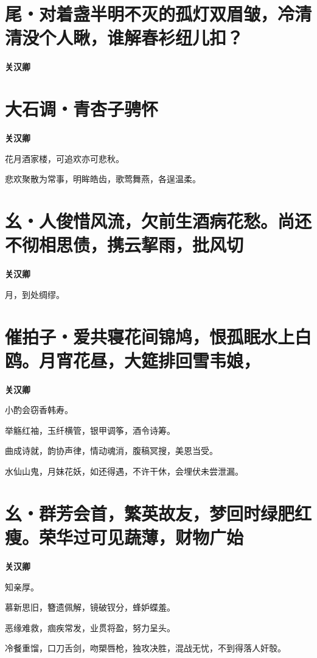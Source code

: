 \documentclass[12pt,a4paper]{ctexbook}
\begin{document}
\section{尾・对着盏半明不灭的孤灯双眉皱，冷清清没个人瞅，谁解春衫纽儿扣？}
\textbf{关汉卿}\par\vspace{0.5em}

\section{大石调・青杏子骋怀}
\textbf{关汉卿}\par\vspace{0.5em}
花月酒家楼，可追欢亦可悲秋。\par
悲欢聚散为常事，明眸皓齿，歌莺舞燕，各逞温柔。\par

\section{幺・人俊惜风流，欠前生酒病花愁。尚还不彻相思债，携云挈雨，批风切}
\textbf{关汉卿}\par\vspace{0.5em}
月，到处绸缪。\par

\section{催拍子・爱共寝花间锦鸠，恨孤眠水上白鸥。月宵花昼，大筵排回雪韦娘，}
\textbf{关汉卿}\par\vspace{0.5em}
小酌会窃香韩寿。\par
举觞红袖，玉纤横管，银甲调筝，酒令诗筹。\par
曲成诗就，韵协声律，情动魂消，腹稿冥搜，美恩当受。\par
水仙山鬼，月妹花妖，如还得遇，不许干休，会埋伏未尝泄漏。\par

\section{幺・群芳会首，繁英故友，梦回时绿肥红瘦。荣华过可见蔬薄，财物广始}
\textbf{关汉卿}\par\vspace{0.5em}
知亲厚。\par
慕新思旧，簪遗佩解，镜破钗分，蜂妒蝶羞。\par
恶缘难救，痼疾常发，业贯将盈，努力呈头。\par
冷餐重馏，口刀舌剑，吻槊唇枪，独攻决胜，混战无忧，不到得落人奸彀。\par
\end{document}
